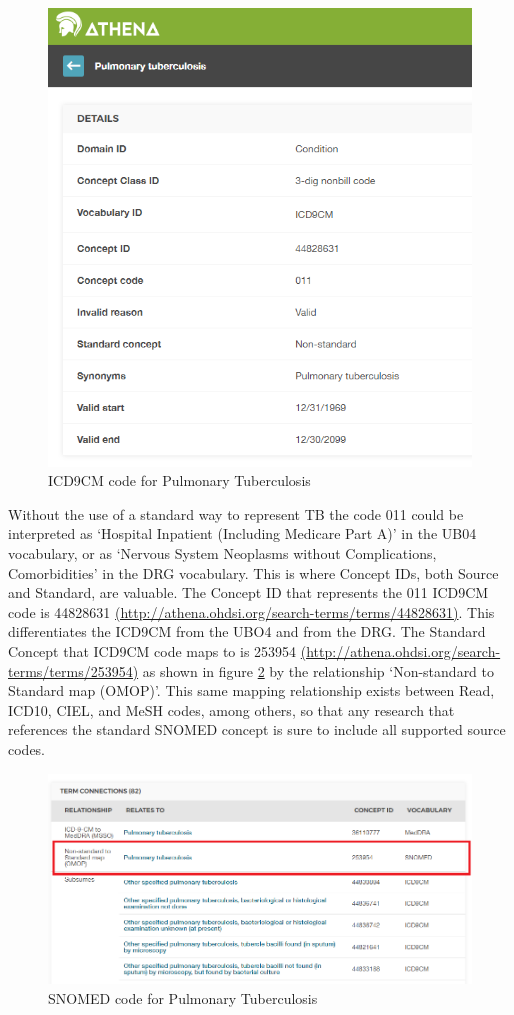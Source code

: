 \documentclass[]{book}
\begin{document}
\begin{figure}
\includegraphics[width=0.75\linewidth]{images/CommonDataModel/pulmTubICD9} \caption{ICD9CM code for Pulmonary Tuberculosis}\label{fig:pulmTubICD9}
\end{figure}

Without the use of a standard way to represent TB the code 011 could be
interpreted as `Hospital Inpatient (Including Medicare Part A)' in the
UB04 vocabulary, or as `Nervous System Neoplasms without Complications,
Comorbidities' in the DRG vocabulary. This is where Concept IDs, both
Source and Standard, are valuable. The Concept ID that represents the
011 ICD9CM code is 44828631
\href{http://athena.ohdsi.org/search-terms/terms/44828631}{(http://athena.ohdsi.org/search-terms/terms/44828631)}.
This differentiates the ICD9CM from the UBO4 and from the DRG. The
Standard Concept that ICD9CM code maps to is 253954
\href{http://athena.ohdsi.org/search-terms/terms/253954}{(http://athena.ohdsi.org/search-terms/terms/253954)}
as shown in figure \ref{fig:pulmTubMap} by the relationship
`Non-standard to Standard map (OMOP)'. This same mapping relationship
exists between Read, ICD10, CIEL, and MeSH codes, among others, so that
any research that references the standard SNOMED concept is sure to
include all supported source codes.

\begin{figure}
\includegraphics[width=1\linewidth]{images/CommonDataModel/pulmTubMap} \caption{SNOMED code for Pulmonary Tuberculosis}\label{fig:pulmTubMap}
\end{figure}
\end{document}
